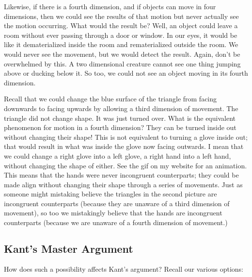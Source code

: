 \documentclass[oneside]{article}
\begin{document}
Likewise, if there is a fourth dimension, and if objects can move in four dimensions, then we could see the results of that motion but never actually see the motion occurring. What would the result be? Well, an object could leave a room without ever passing through a door or window. In our eyes, it would be like it dematerialized inside the room and rematerialized outside the room. We would never see the movement, but we would detect the result. Again, don't be overwhelmed by this. A two dimensional creature cannot see one thing jumping above or ducking below it. So too, we could not see an object moving in its fourth dimension. 

Recall that we could change the blue surface of the triangle from facing downwards to facing upwards by allowing a third dimension of movement. The triangle did not change shape. It was just turned over. What is the equivalent phenomenon for motion in a fourth dimension? They can be turned inside out without changing their shape! This is not equivalent to turning a glove inside out; that would result in what was inside the glove now facing outwards. I mean that we could change a right glove into a left glove, a right hand into a left hand, without changing the shape of either. See the gif on my website for an animation. This means that the hands were never incongruent counterparts; they could be made align without changing their shape through a series of movements. Just as someone might mistaking believe the triangles in the second picture are incongruent counterparts (because they are unaware of a  third dimension of movement), so too we mistakingly believe that the hands are incongruent counterparts (because we are unaware of a fourth dimension of movement.) 

 

\subsection*{Kant's Master Argument}

How does such a possibility affects Kant's argument? Recall our various options: 
\end{document}
